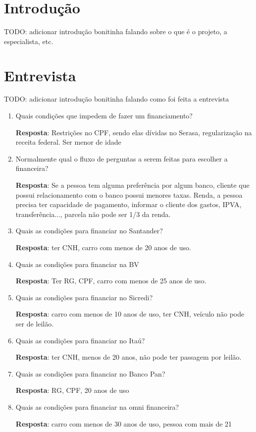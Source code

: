 \documentclass[12pt, a4paper]{article}
\begin{document}
\capa%
\tableofcontents%
\listoffigures\cleardoublepage%

\section{Introdução}\label{sec:intro}
TODO: adicionar introdução bonitinha falando sobre o que é o projeto,
a especialista, etc.

\section{Entrevista}\label{sec:entrevista}
TODO: adicionar introdução bonitinha falando como foi feita a entrevista
\begin{enumerate}
    \item Quais condições que impedem de fazer um financiamento?

    \textbf{Resposta}: Restrições no CPF, sendo elas dívidas no Serasa, regularização na receita federal. Ser menor de idade

    \item Normalmente qual o fluxo de perguntas a serem feitas para escolher a financeira?

    \textbf{Resposta}: Se a pessoa tem alguma preferência por algum banco, cliente que possui relacionamento com o banco possui menores taxas. Renda, a pessoa precisa ter capacidade de pagamento, informar o cliente dos gastos, IPVA, transferência..., parcela não pode ser 1/3 da renda.

    \item Quais as condições para financiar no Santander?

    \textbf{Resposta}: ter CNH, carro com menos de 20 anos de uso.

    \item Quais as condições para financiar na BV

    \textbf{Resposta}: Ter RG, CPF, carro com menos de 25 anos de uso.

    \item Quais as condições para financiar no Sicredi?

    \textbf{Resposta}: carro com menos de 10 anos de uso, ter CNH, veículo não pode ser de leilão.

    \item Quais as condições para financiar no Itaú?

    \textbf{Resposta}: ter CNH, menos de 20 anos, não pode ter passagem por leilão.

    \item Quais as condições para financiar no Banco Pan?

    \textbf{Resposta}: RG, CPF, 20 anos de uso

    \item Quais as condições para financiar na omni financeira?

    \textbf{Resposta}: carro com menos de 30 anos de uso, pessoa com mais de 21
\end{enumerate}


\end{document}
